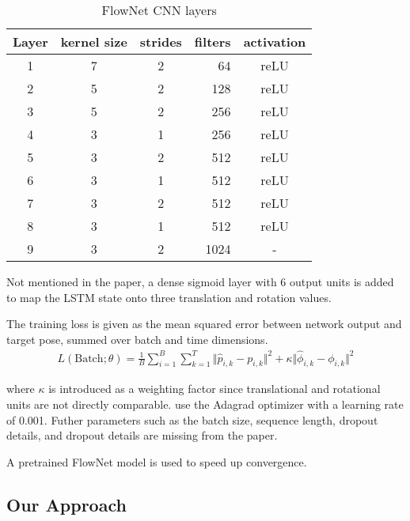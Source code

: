 \documentclass[a4paper,11pt]{article}
\begin{document}
\begin{table}
    \centering
    \caption{FlowNet CNN layers}
    \label{tab:cnn}
    \begin{tabular}{cccrc}
        Layer & kernel size & strides & filters & activation\\\hline
        1     & 7           & 2       & 64      & reLU\\
        2     & 5           & 2       & 128     & reLU\\
        3     & 5           & 2       & 256     & reLU\\
        4     & 3           & 1       & 256     & reLU\\
        5     & 3           & 2       & 512     & reLU\\
        6     & 3           & 1       & 512     & reLU\\
        7     & 3           & 2       & 512     & reLU\\
        8     & 3           & 1       & 512     & reLU\\
        9     & 3           & 2       & 1024    & -\\\hline
    \end{tabular}
\end{table}

Not mentioned in the paper, a dense sigmoid layer with 6 output units is added
to map the LSTM state onto three translation and rotation values.

The training loss is given as the mean squared error between network output and
target pose, summed over batch and time dimensions.
\begin{align}
    L(\text{Batch}; \theta) = \frac{1}{B} \sum^{B}_{i=1} \sum^{T}_{k=1}
    \Vert\hat{p}_{i,k} - p_{i,k} \Vert^2 + \kappa \Vert \hat{\phi}_{i,k} - \phi_{i,k} \Vert^2
\end{align}

where $\kappa$ is introduced as a weighting factor since translational and
rotational units are not directly comparable. \cite{wang2017deepvo} use the
Adagrad optimizer with a learning rate of 0.001. Futher parameters such as the
batch size, sequence length, dropout details, and dropout details are
missing from the paper.

A pretrained FlowNet model is used to speed up convergence.

\subsection{Our Approach}
\label{sec:deepvo:approach}
\end{document}
